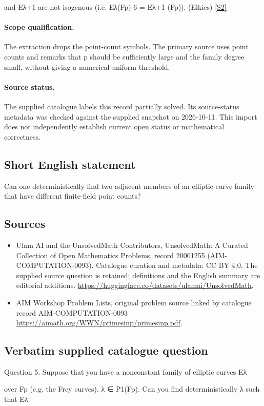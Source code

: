 \documentclass[11pt]{article}
\begin{document}
and Eλ+1 are not isogenous (i.e. Eλ(Fp) 6 = Eλ+1 (Fp)). (Elkies) \href{https://aimath.org/WWN/primesinp/primesinp.pdf}{[S2]}
\paragraph{Scope qualification.}
The extraction drops the point-count symbols. The primary source uses point counts and remarks that p should be sufficiently large and the family degree small, without giving a numerical uniform threshold.
\paragraph{Source status.}
The supplied catalogue labels this record partially solved. Its source-status metadata was checked against the supplied snapshot on 2026-10-11. This import does not independently establish current open status or mathematical correctness.
\subsection{Short English statement}
Can one deterministically find two adjacent members of an elliptic-curve family that have different finite-field point counts?
\subsection{Sources}
\begin{itemize}
\item[S1] Ulam AI and the UnsolvedMath Contributors, UnsolvedMath: A Curated Collection of Open Mathematics Problems, record 20001255 (AIM-COMPUTATION-0093). Catalogue curation and metadata: CC BY 4.0. The supplied source question is retained; definitions and the English summary are editorial additions.
\url{https://huggingface.co/datasets/ulamai/UnsolvedMath}.
\item[S2] AIM Workshop Problem Lists, original problem source linked by catalogue record AIM-COMPUTATION-0093
\url{https://aimath.org/WWN/primesinp/primesinp.pdf}.
\end{itemize}
\subsection{Verbatim supplied catalogue question}
Question 5. Suppose that you have a nonconstant family of elliptic curves Eλ

over Fp (e.g. the Frey curves), λ ∈ P1(Fp). Can you find deterministically λ such that Eλ
\end{document}
